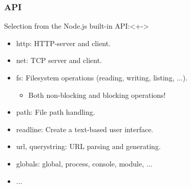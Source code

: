\begin{frame}
	\frametitle{API}

	\begin{block}{Selection from the Node.js built-in API:}<+->
		\begin{itemize}[<+-| highlight@+>]
			\item \alert{http}: HTTP-server and client.
			\item \alert{net}: TCP server and client.
			\item \alert{fs}: Filesystem operations (reading, writing, listing, ...).
			\begin{itemize}[<+->]
				\item Both non-blocking and blocking operations!
			\end{itemize}
			\item \alert{path}: File path handling.
			\item \alert{readline}: Create a text-based user interface.
			\item \alert{url}, \alert{querystring}: URL parsing and generating.
			\item \alert{globals}: global, process, console, module, ...
			\item ...
		\end{itemize}
	\end{block}
\end{frame}


